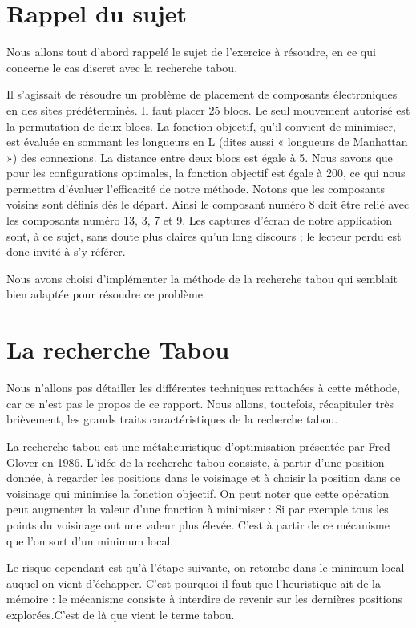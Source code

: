 \documentclass{report}
\begin{document}
\section{Rappel du sujet}

Nous allons tout d’abord rappelé le sujet de l’exercice à résoudre, en ce qui concerne
le cas discret avec la recherche tabou.

Il s’agissait de résoudre un problème de placement de composants électroniques
en des sites prédéterminés. Il faut placer 25 blocs. Le seul mouvement autorisé est
la permutation de deux blocs. La fonction objectif, qu’il convient de minimiser, est
évaluée en sommant les longueurs en L (dites aussi « longueurs de Manhattan ») des
connexions. La distance entre deux blocs est égale à 5. Nous savons que pour les
configurations optimales, la fonction objectif est égale à 200, ce qui nous permettra
d’évaluer l’efficacité de notre méthode. Notons que les composants voisins sont définis dès le départ. Ainsi le composant numéro 8 doit être relié avec les composants
numéro 13, 3, 7 et 9. Les captures d’écran de notre application sont, à ce sujet, sans
doute plus claires qu’un long discours ; le lecteur perdu est donc invité à s’y référer.

Nous avons choisi d’implémenter la méthode de la recherche tabou qui semblait bien
adaptée pour résoudre ce problème.

\section{La recherche Tabou}
Nous n’allons pas détailler les différentes techniques rattachées à  cette méthode, car ce n’est pas le
propos de ce rapport. Nous allons, toutefois, récapituler très brièvement, les grands
traits caractéristiques de la recherche tabou.

La recherche tabou est une métaheuristique d'optimisation présentée par Fred Glover en 1986.
L'idée de la recherche tabou consiste, à partir d'une position donnée, à regarder les positions dans le voisinage et à choisir la position dans ce voisinage qui minimise la fonction objectif.
On peut noter que cette opération peut augmenter la valeur d'une fonction à minimiser : Si par exemple tous les points du voisinage ont une valeur plus élevée. C'est à partir de ce mécanisme que l'on sort d'un minimum local.

Le risque cependant est qu'à l'étape suivante, on retombe dans le minimum local auquel on vient d'échapper. C'est pourquoi il faut que l'heuristique ait de la mémoire : le mécanisme consiste à interdire de revenir sur les dernières positions explorées.C'est de là que vient le terme tabou.
\end{document}

